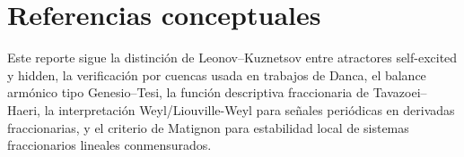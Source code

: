 \documentclass[11pt]{article}
\begin{document}
\section*{Referencias conceptuales}

Este reporte sigue la distinción de Leonov--Kuznetsov entre atractores
self-excited y hidden, la verificación por cuencas usada en trabajos de Danca,
el balance armónico tipo Genesio--Tesi, la función descriptiva fraccionaria de
Tavazoei--Haeri, la interpretación Weyl/Liouville-Weyl para señales periódicas
en derivadas fraccionarias, y el criterio de Matignon para estabilidad local de
sistemas fraccionarios lineales conmensurados.
\end{document}
